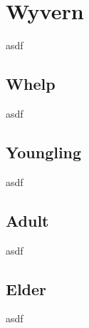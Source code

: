 \section{Wyvern}

asdf

\subsection{Whelp}

asdf

\subsection{Youngling}

asdf

\subsection{Adult}

asdf

\subsection{Elder}

asdf